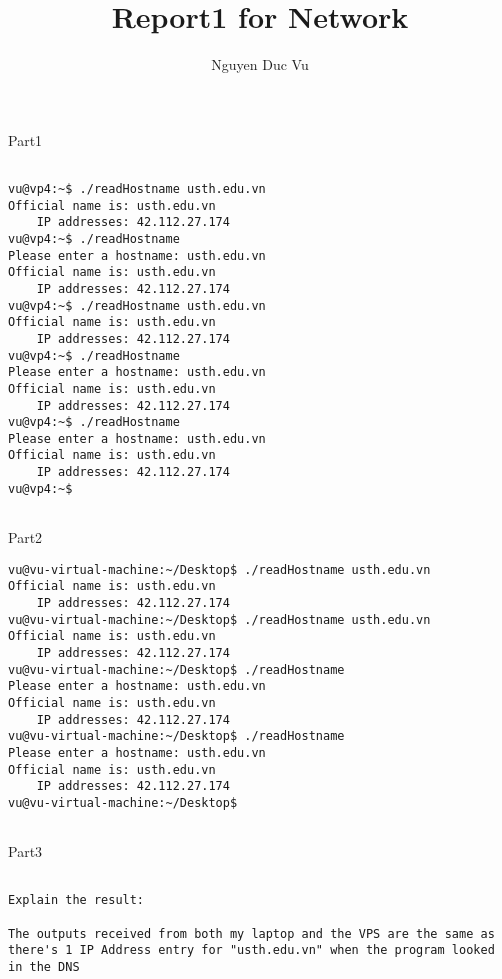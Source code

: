 \documentclass{report}
\title{Report1 for Network}
\author{Nguyen Duc Vu}
\begin{document}
\maketitle

\begin{section}{Part1}


\begin{verbatim}

vu@vp4:~$ ./readHostname usth.edu.vn
Official name is: usth.edu.vn
    IP addresses: 42.112.27.174 
vu@vp4:~$ ./readHostname
Please enter a hostname: usth.edu.vn
Official name is: usth.edu.vn
    IP addresses: 42.112.27.174 
vu@vp4:~$ ./readHostname usth.edu.vn
Official name is: usth.edu.vn
    IP addresses: 42.112.27.174 
vu@vp4:~$ ./readHostname
Please enter a hostname: usth.edu.vn
Official name is: usth.edu.vn
    IP addresses: 42.112.27.174 
vu@vp4:~$ ./readHostname
Please enter a hostname: usth.edu.vn
Official name is: usth.edu.vn
    IP addresses: 42.112.27.174 
vu@vp4:~$ 


\end{verbatim}

\end{section}


\begin{section}{Part2}


\begin{verbatim}
vu@vu-virtual-machine:~/Desktop$ ./readHostname usth.edu.vn
Official name is: usth.edu.vn
    IP addresses: 42.112.27.174 
vu@vu-virtual-machine:~/Desktop$ ./readHostname usth.edu.vn
Official name is: usth.edu.vn
    IP addresses: 42.112.27.174 
vu@vu-virtual-machine:~/Desktop$ ./readHostname
Please enter a hostname: usth.edu.vn
Official name is: usth.edu.vn
    IP addresses: 42.112.27.174 
vu@vu-virtual-machine:~/Desktop$ ./readHostname
Please enter a hostname: usth.edu.vn
Official name is: usth.edu.vn
    IP addresses: 42.112.27.174 
vu@vu-virtual-machine:~/Desktop$ 


\end{verbatim}

\end{section}


\begin{section}{Part3}
\begin{verbatim}

Explain the result:

The outputs received from both my laptop and the VPS are the same as there's 1 IP Address entry for "usth.edu.vn" when the program looked in the DNS 

\end{verbatim}
\end{section}
\end{document}
